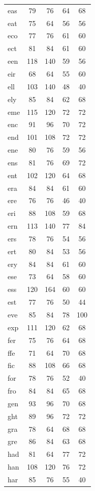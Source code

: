 \documentclass[ms,electronic,twosidetoc,letterpaper,chaptercenter,parttop,lof,lot]{byumsphd}
\begin{document}
\begin{table}
\begin{tabular}{| l | c c | c c |}
  eas & 79 & 76 & 64 & 68 \\
  eat & 75 & 64 & 56 & 56 \\
  eco & 77 & 76 & 61 & 60 \\
  ect & 81 & 84 & 61 & 60 \\
  een & 118 & 140 & 59 & 56 \\
  eir & 68 & 64 & 55 & 60 \\
  ell & 103 & 140 & 48 & 40 \\
  ely & 85 & 84 & 62 & 68 \\
  eme & 115 & 120 & 72 & 72 \\
  enc & 91 & 96 & 70 & 72 \\
  end & 101 & 108 & 72 & 72 \\
  ene & 80 & 76 & 59 & 56 \\
  ens & 81 & 76 & 69 & 72 \\
  ent & 102 & 120 & 64 & 68 \\
  era & 84 & 84 & 61 & 60 \\
  ere & 76 & 76 & 46 & 40 \\
  eri & 88 & 108 & 59 & 68 \\
  ern & 113 & 140 & 77 & 84 \\
  ers & 78 & 76 & 54 & 56 \\
  ert & 80 & 84 & 53 & 56 \\
  ery & 84 & 84 & 61 & 60 \\
  ese & 73 & 64 & 58 & 60 \\
  ess & 120 & 164 & 60 & 60 \\
  est & 77 & 76 & 50 & 44 \\
  eve & 85 & 84 & 78 & 100 \\
  exp & 111 & 120 & 62 & 68 \\
  fer & 75 & 76 & 64 & 68 \\
  ffe & 71 & 64 & 70 & 68 \\
  fic & 88 & 108 & 66 & 68 \\
  for & 78 & 76 & 52 & 40 \\
  fro & 84 & 84 & 65 & 68 \\
  gen & 93 & 96 & 70 & 68 \\
  ght & 89 & 96 & 72 & 72 \\
  gra & 78 & 64 & 68 & 68 \\
  gre & 86 & 84 & 63 & 68 \\
  had & 81 & 64 & 77 & 72 \\
  han & 108 & 120 & 76 & 72 \\
  har & 85 & 76 & 55 & 40 \\

\end{tabular}
\end{table}
\end{document}

